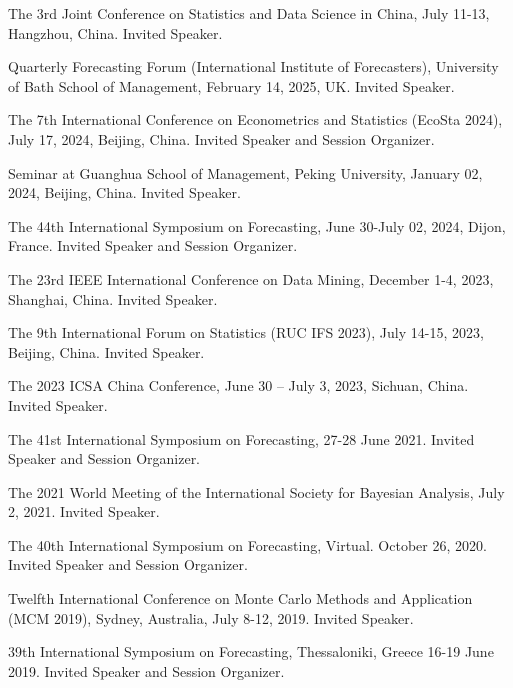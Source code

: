 \documentclass[twoside,a4paper]{article}
\begin{document}
\begin{etaremune}[itemsep=0ex,parsep=0pt]

\item The 3rd Joint Conference on Statistics and Data Science in China, July 11-13, Hangzhou, China. Invited Speaker.

\item Quarterly Forecasting Forum (International Institute of Forecasters), University of Bath School of Management, February 14, 2025, UK. Invited Speaker.

\item The 7th International Conference on Econometrics and Statistics (EcoSta 2024), July 17, 2024, Beijing, China. Invited Speaker and Session Organizer.

\item Seminar at Guanghua School of Management, Peking University, January 02, 2024, Beijing, China. Invited Speaker.

\item The 44th International Symposium on Forecasting, June 30-July 02, 2024, Dijon, France. Invited Speaker and Session Organizer.

\item The 23rd IEEE International Conference on Data Mining, December 1-4, 2023, Shanghai, China. Invited Speaker.

\item The 9th International Forum on Statistics (RUC IFS 2023), July 14-15, 2023, Beijing, China. Invited Speaker.

\item The 2023 ICSA China Conference, June 30 – July 3, 2023, Sichuan, China. Invited Speaker.

\item The 41st International Symposium on Forecasting, 27-28 June 2021. Invited Speaker and Session Organizer.

\item The 2021 World Meeting of the International Society for Bayesian Analysis, July 2, 2021. Invited Speaker.

\item The 40th International Symposium on Forecasting, Virtual. October 26, 2020. Invited Speaker and Session Organizer.

\item Twelfth International Conference on Monte Carlo Methods and Application (MCM 2019), Sydney, Australia, July 8-12, 2019. Invited Speaker.

\item 39th International Symposium on Forecasting, Thessaloniki, Greece 16-19 June 2019. Invited Speaker and Session Organizer.


\end{etaremune}
\end{document}

